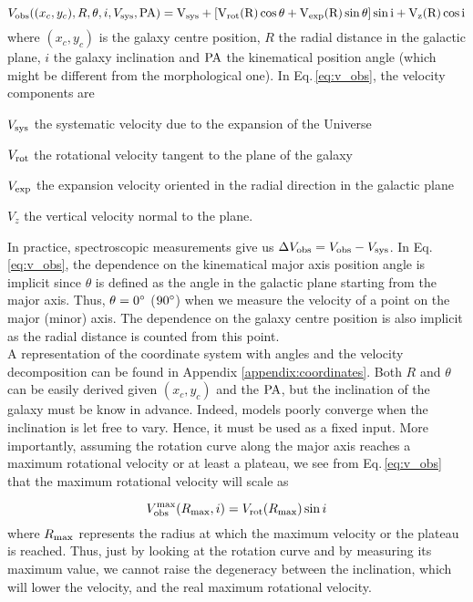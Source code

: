 \begin{equation}
	V_{\rm{obs}} ( (x_c , y_c) , R, \theta , i, V_{\rm{sys}} , \rm{PA} ) = V_{\rm{sys}} + \left [ V_{\rm{rot}} (R) \cos \theta + V_{\rm{exp}} (R) \sin \theta \right ] \sin i + V_z (R) \cos i
	\label{eq:v_obs}
\end{equation}
where $(x_c , y_c)$ is the galaxy centre position, $R$ the radial distance in the galactic plane, $i$ the galaxy inclination and $\rm{PA}$ the kinematical position angle (which might be different from the morphological one). In Eq.\,\ref{eq:v_obs}, the velocity components are
\begin{enumerate*}[label={(\alph*)}]
	\item $V_{\rm{sys}}$ the systematic velocity due to the expansion of the Universe
	\item $V_{\rm{rot}}$ the rotational velocity tangent to the plane of the galaxy
	\item $V_{\rm{exp}}$ the expansion velocity oriented in the radial direction in the galactic plane
	\item $V_z$ the vertical velocity normal to the plane.
\end{enumerate*}

In practice, spectroscopic measurements give us $\Delta V_{\rm{obs}} = V_{\rm{obs}} - V_{\rm{sys}}$. In Eq.\,\ref{eq:v_obs}, the dependence on the kinematical major axis position angle is implicit since $\theta$ is defined as the angle in the galactic plane starting from the major axis. Thus, $\theta = 0 \degree$ ($90 \degree$) when we measure the velocity of a point on the major (minor) axis. The dependence on the galaxy centre position is also implicit as the radial distance is counted from this point. \\

A representation of the coordinate system with angles and the velocity decomposition can be found in Appendix \ref{appendix:coordinates}. Both $R$ and $\theta$  can be easily derived given $(x_c , y_c)$ and the $\rm{PA}$, but the inclination of the galaxy must be know in advance. Indeed, models poorly converge when the inclination is let free to vary. Hence, it must be used as a fixed input. More importantly, assuming the rotation curve along the major axis reaches a maximum rotational velocity or at least a plateau, we see from Eq.\,\ref{eq:v_obs} that the maximum rotational velocity will scale as

\begin{equation}
	V_{\rm{obs}}^{\rm{max}} (R_{\rm{max}}, i) = V_{\rm{rot}} (R_{\rm{max}}) \sin i
\end{equation}
where $R_{\rm{max}}$ represents the radius at which the maximum velocity or the plateau is reached. Thus, just by looking at the rotation curve and by measuring its maximum value, we cannot raise the degeneracy between the inclination, which will lower the velocity, and the real maximum rotational velocity.


